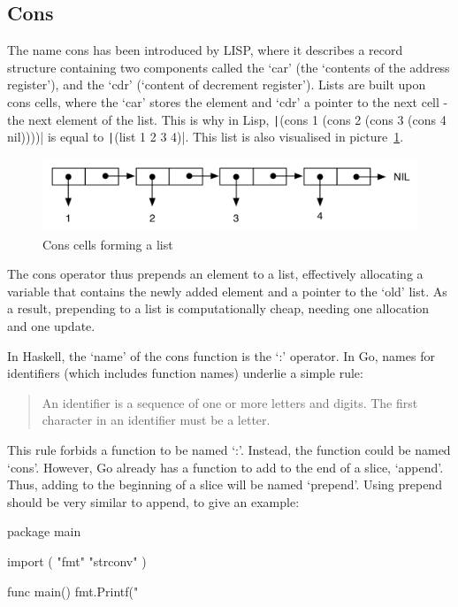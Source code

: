 \subsection{Cons}

The name cons has been introduced by LISP, where it describes a record structure
containing two components called the `car' (the `contents of the address register'),
and the `cdr' (`content of decrement register').
Lists are built upon cons cells, where the `car' stores the element and `cdr' a
pointer to the next cell - the next element of the list.
This is why in Lisp, \texttt|(cons 1 (cons 2 (cons 3 (cons 4 nil))))| is equal to
\texttt|(list 1 2 3 4)|. This list is also visualised in picture~\ref{fig:cons}.

\begin{figure}[h!]
  \includegraphics[width=\linewidth]{../img/cons.png}
  \caption{Cons cells forming a list\autocite{cons-image-source}}
  \label{fig:cons}
\end{figure}

The cons operator thus prepends an element to a list, effectively allocating a
variable that contains the newly added element and a pointer to the `old' list.
As a result, prepending to a list is computationally cheap, needing one allocation
and one update.

In Haskell, the `name' of the cons function is the `:' operator.
In Go, names for identifiers (which includes function names) underlie a simple
rule:
\begin{quote}
    An identifier is a sequence of one or more letters and digits. The first
    character in an identifier must be a letter.\autocite{spec-identifiers}
\end{quote}

This rule forbids a function to be named `:'. Instead, the function could be
named `cons'. However, Go already has a function to add to the end of a slice,
`append'. Thus, adding to the beginning of a slice will be named `prepend'.
Using prepend should be very similar to append, to give an example:

\begin{code}
    \label{code:prepend-go}
    \begin{gocode}
package main

import (
  "fmt"
  "strconv"
)

func main() {
    fmt.Printf("%
}
\end{gocode}
\end{code}
